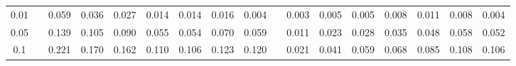 % 
\begin{tabular}{ccccccccccccccccc}
  \hline
  \hline
0.01 &  & 0.059 & 0.036 & 0.027 & 0.014 & 0.014 & 0.016 & 0.004 &  & 0.003 & 0.005 & 0.005 & 0.008 & 0.011 & 0.008 & 0.004 \\ 
  0.05 &  & 0.139 & 0.105 & 0.090 & 0.055 & 0.054 & 0.070 & 0.059 &  & 0.011 & 0.023 & 0.028 & 0.035 & 0.048 & 0.058 & 0.052 \\ 
  0.1 &  & 0.221 & 0.170 & 0.162 & 0.110 & 0.106 & 0.123 & 0.120 &  & 0.021 & 0.041 & 0.059 & 0.068 & 0.085 & 0.108 & 0.106 \\ 
   \hline
\end{tabular}
